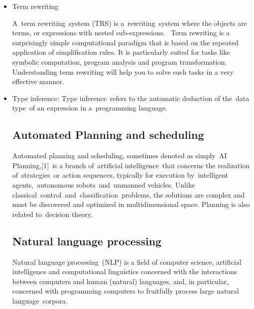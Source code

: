 \documentclass[14pt]{article}
\begin{document}
\begin{itemize}
\item Term rewriting

A term rewriting system (TRS) is a rewriting system where the objects are terms, or expressions with nested sub-expressions. 
Term rewriting is a surprisingly simple computational paradigm that is based on the repeated application of simplification rules. It is particularly suited for tasks like symbolic computation, program analysis and program transformation. Understanding term rewriting will help you to solve such tasks in a very effective manner.

\item Type inference: 
Type inference refers to the automatic deduction of the data type of an expression in a programming language.

\subsection{Automated Planning and scheduling}

Automated planning and scheduling, sometimes denoted as simply AI Planning,[1] is a branch of artificial intelligence that concerns the realization of strategies or action sequences, typically for execution by intelligent agents, autonomous robots and unmanned vehicles. Unlike classical control and classification problems, the solutions are complex and must be discovered and optimized in multidimensional space. Planning is also related to decision theory.


\subsection{Natural language processing}

Natural language processing (NLP) is a field of computer science, artificial intelligence and computational linguistics concerned with the interactions between computers and human (natural) languages, and, in particular, concerned with programming computers to fruitfully process large natural language corpora.

\end{itemize}
\newpage 
\end{document}
